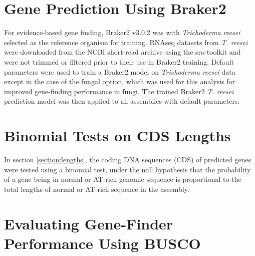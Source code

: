 \section{Gene Prediction Using Braker2}

For evidence-based gene finding, Braker2 v3.0.2\cite{Bruna2021} was
with \textit{Trichoderma reesei} selected as the reference organism
for training. RNAseq datasets from \textit{T. reesei} were downloaded
from the NCBI short-read archive using the sra-toolkit\cite{NCBI2025}
and were not trimmed or filtered prior to their use in Braker2
training. Default parameters were used to train a Braker2 model on
\textit{Trichoderma reesei} data except in the case of the fungal
option, which was used for this analysis for improved gene-finding
performance in fungi. The trained Braker2 \textit{T. reesei}
prediction model was then applied to all assemblies with default
parameters.


\section{Binomial Tests on CDS Lengths}

In section \ref{section:lengths}, the coding DNA sequences (CDS) of
predicted genes were tested using a binomial test, under the null
hypothesis that the probability of a gene being in normal or AT-rich
genomic sequence is proportional to the total lengths of normal or
AT-rich sequence in the assembly.

\section{Evaluating Gene-Finder Performance Using BUSCO}

